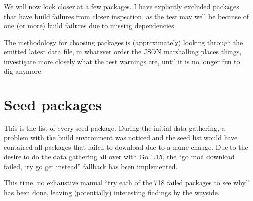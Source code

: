 \documentclass[a4paper]{paper}
\begin{document}
We will now look closer at a few packages. I have explicitly excluded
packages that have build failures from closer inspection, as the test
may well be because of one (or more) build failures due to missing
dependencies.

The methodology for choosing packages is (approximately) looking
through the emitted latest data file, in whatever order the JSON
marshalling places things, investigate more closely what the test
warnings are, until it is no longer fun to dig anymore.



\section{Seed packages}

This is the list of every seed package. During the initial data gathering, a
problem with the build environment was noticed and the seed list
would have contained all packages that failed to download due to a name
change. Due to the desire to do the data gathering all over with Go 1.15, the ``go mod download failed, try go get instead'' fallback has been implemented.

This time, no exhaustive manual ``try each of the 718 failed packages
to see why'' has been done, leaving (potentially) interesting findings
by the wayside.


\end{document}
